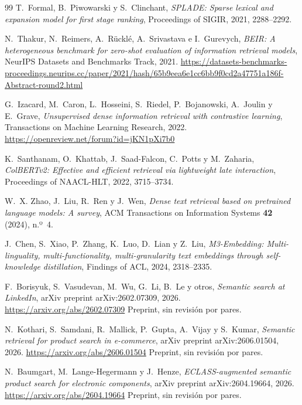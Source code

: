 \documentclass[11pt,letterpaper]{article}
\numberwithin{equation}{section}
\begin{document}
\begin{thebibliography}{99}
T.~Formal, B.~Piwowarski y S.~Clinchant,
\textit{SPLADE: Sparse lexical and expansion model for first stage ranking},
Proceedings of SIGIR, 2021, 2288--2292.

N.~Thakur, N.~Reimers, A.~R{\"u}ckl{\'e}, A.~Srivastava e I.~Gurevych,
\textit{BEIR: A heterogeneous benchmark for zero-shot evaluation of information retrieval models},
NeurIPS Datasets and Benchmarks Track, 2021.
\url{https://datasets-benchmarks-proceedings.neurips.cc/paper/2021/hash/65b9eea6e1cc6bb9f0cd2a47751a186f-Abstract-round2.html}

G.~Izacard, M.~Caron, L.~Hosseini, S.~Riedel, P.~Bojanowski, A.~Joulin y E.~Grave,
\textit{Unsupervised dense information retrieval with contrastive learning},
Transactions on Machine Learning Research, 2022.
\url{https://openreview.net/forum?id=jKN1pXi7b0}

K.~Santhanam, O.~Khattab, J.~Saad-Falcon, C.~Potts y M.~Zaharia,
\textit{ColBERTv2: Effective and efficient retrieval via lightweight late interaction},
Proceedings of NAACL-HLT, 2022, 3715--3734.

W.~X. Zhao, J.~Liu, R.~Ren y J.~Wen,
\textit{Dense text retrieval based on pretrained language models: A survey},
ACM Transactions on Information Systems \textbf{42} (2024), n.º~4.

J.~Chen, S.~Xiao, P.~Zhang, K.~Luo, D.~Lian y Z.~Liu,
\textit{M3-Embedding: Multi-linguality, multi-functionality, multi-granularity text embeddings through self-knowledge distillation},
Findings of ACL, 2024, 2318--2335.

F.~Borisyuk, S.~Vasudevan, M.~Wu, G.~Li, B.~Le y otros,
\textit{Semantic search at LinkedIn},
arXiv preprint arXiv:2602.07309, 2026.
\url{https://arxiv.org/abs/2602.07309} Preprint, sin revisión por pares.

N.~Kothari, S.~Samdani, R.~Mallick, P.~Gupta, A.~Vijay y S.~Kumar,
\textit{Semantic retrieval for product search in e-commerce},
arXiv preprint arXiv:2606.01504, 2026.
\url{https://arxiv.org/abs/2606.01504} Preprint, sin revisión por pares.

N.~Baumgart, M.~Lange-Hegermann y J.~Henze,
\textit{ECLASS-augmented semantic product search for electronic components},
arXiv preprint arXiv:2604.19664, 2026.
\url{https://arxiv.org/abs/2604.19664} Preprint, sin revisión por pares.


\end{thebibliography}
\end{document}

